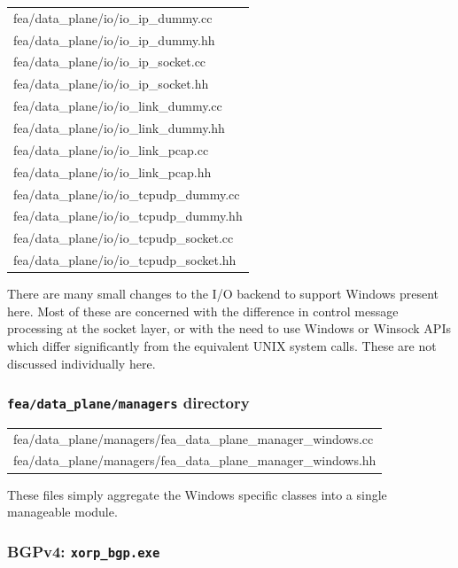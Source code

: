\documentclass[11pt]{article}
\begin{document}
{\begin{center}
\begin{tabular}{|l|}
 \hline
	fea/data\_plane/io/io\_ip\_dummy.cc \\
	fea/data\_plane/io/io\_ip\_dummy.hh \\
	fea/data\_plane/io/io\_ip\_socket.cc \\
	fea/data\_plane/io/io\_ip\_socket.hh \\
	fea/data\_plane/io/io\_link\_dummy.cc \\
	fea/data\_plane/io/io\_link\_dummy.hh \\
	fea/data\_plane/io/io\_link\_pcap.cc \\
	fea/data\_plane/io/io\_link\_pcap.hh \\
	fea/data\_plane/io/io\_tcpudp\_dummy.cc \\
	fea/data\_plane/io/io\_tcpudp\_dummy.hh \\
	fea/data\_plane/io/io\_tcpudp\_socket.cc \\
	fea/data\_plane/io/io\_tcpudp\_socket.hh \\
 \hline
\end{tabular}
\end{center}

There are many small changes to the I/O backend to support Windows
present here.
Most of these are concerned with the difference in control message processing
at the socket layer, or with the need to use Windows or Winsock APIs
which differ significantly from the equivalent UNIX system calls.
These are not discussed individually here.

\subsubsection{{\tt fea/data\_plane/managers} directory}

\begin{center}
\begin{tabular}{|l|}
 \hline
	fea/data\_plane/managers/fea\_data\_plane\_manager\_windows.cc \\
	fea/data\_plane/managers/fea\_data\_plane\_manager\_windows.hh \\
 \hline
\end{tabular}
\end{center}

These files simply aggregate the Windows specific classes into a single manageable module.

\subsubsection{BGPv4: {\tt xorp\_bgp.exe}}

}
\end{document}
